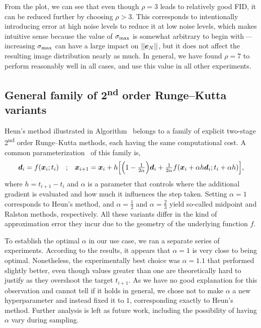 From the plot, we can see that even though $\rho=3$ leads to relatively good FID, it can be reduced further by choosing $\rho > 3$.
This corresponds to intentionally introducing error at high noise levels to reduce it at low noise levels, which makes intuitive sense because the value of $\smax$ is somewhat arbitrary to begin with\,---\,increasing $\smax$ can have a large impact on $||\boldsymbol{e}_N||$, but it does not affect the resulting image distribution nearly as much.
In general, we have found $\rho=7$ to perform reasonably well in all cases, and use this value in all other experiments.

\subsection{\texorpdfstring{General family of 2\textsuperscript{nd} order Runge--Kutta variants}{General family of 2nd order Runge-Kutta variants}}
\label{app:alpha}

Heun's method illustrated in Algorithm~ belongs to a family of explicit two-stage 2\textsuperscript{nd} order Runge--Kutta methods, each having the same computational cost.
A common parameterization~\cite{Suli2003} of this family is,
\begin{equation}
\dd_i = f(\xx_i;t_i)\ \ \ \textrm{;} \ \ \ \xx_{i+1} = \xx_i + h\Big[\Big(1-{\tfrac{1}{2\alpha}}\Big)\dd_i+{\tfrac{1}{2\alpha}}f(\xx_i + \alpha h \dd_i;t_i+\alpha h)\Big]\textrm{,}
\end{equation}
where $h=t_{i+1}-t_i$ and $\alpha$ is a parameter that controls where the additional gradient is evaluated and how much it influences the step taken.
Setting $\alpha=1$ corresponds to Heun's method, and $\alpha=\tfrac{1}{2}$ and $\alpha=\tfrac{2}{3}$ yield so-called midpoint and Ralston methods, respectively.
All these variants differ in the kind of approximation error they incur due to the geometry of the underlying function $f$.

To establish the optimal $\alpha$ in our use case, we ran a separate series of experiments.
According to the results, it appears that $\alpha=1$ is very close to being optimal.
Nonetheless, the experimentally best choice was $\alpha=1.1$ that performed slightly better, even though values greater than one are theoretically hard to justify as they overshoot the target $t_{i+1}$.
As we have no good explanation for this observation and cannot tell if it holds in general, we chose not to make $\alpha$ a new hyperparameter and instead fixed it to $1$, corresponding exactly to Heun's method.
Further analysis is left as future work, including the possibility of having $\alpha$ vary during sampling.

